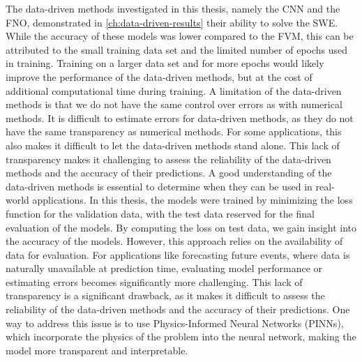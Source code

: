 The data-driven methods investigated in this thesis, namely the CNN and the FNO, demonstrated in \autoref{ch:data-driven-results} their ability to solve the SWE.
While the accuracy of these models was lower compared to the FVM, this can be attributed to the small training data set and the limited number of epochs used in training.
Training on a larger data set and for more epochs would likely improve the performance of the data-driven methods, but at the cost of additional computational time during training.
A limitation of the data-driven methods is that we do not have the same control over errors as with numerical methods.
It is difficult to estimate errors for data-driven methods, as they do not have the same transparency as numerical methods.
For some applications, this also makes it difficult to let the data-driven methods stand alone.
This lack of transparency makes it challenging to assess the reliability of the data-driven methods and the accuracy of their predictions.
A good understanding of the data-driven methods is essential to determine when they can be used in real-world applications.
In this thesis, the models were trained by minimizing the loss function for the validation data, with the test data reserved for the final evaluation of the models.
By computing the loss on test data, we gain insight into the accuracy of the models.
However, this approach relies on the availability of data for evaluation.
For applications like forecasting future events, where data is naturally unavailable at prediction time, evaluating model performance or estimating errors becomes significantly more challenging.
This lack of transparency is a significant drawback, as it makes it difficult to assess the reliability of the data-driven methods and the accuracy of their predictions.
One way to address this issue is to use Physics-Informed Neural Networks (PINNs), which incorporate the physics of the problem into the neural network, making the model more transparent and interpretable.

